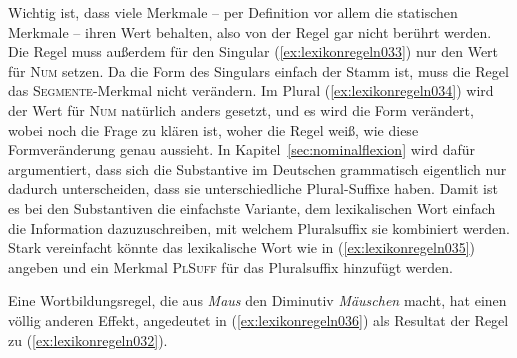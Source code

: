 \begin{exe}
  \ex\label{ex:lexikonregeln031}
  \begin{xlist}
  \end{xlist}
\end{exe}

Wichtig ist, dass viele Merkmale -- per Definition vor allem die statischen Merkmale -- ihren Wert behalten, also von der Regel gar nicht berührt werden.
Die Regel muss außerdem für den Singular (\ref{ex:lexikonregeln033}) nur den Wert für \textsc{Num} setzen.
Da die Form des Singulars einfach der Stamm ist, muss die Regel das \textsc{Segmente}-Merkmal nicht verändern.
Im Plural (\ref{ex:lexikonregeln034}) wird der Wert für \textsc{Num} natürlich anders gesetzt, und es wird die Form verändert, wobei noch die Frage zu klären ist, woher die Regel weiß, wie diese Formveränderung genau aussieht.
In Kapitel~\ref{sec:nominalflexion} wird dafür argumentiert, dass sich die Substantive im Deutschen grammatisch eigentlich nur dadurch unterscheiden, dass sie unterschiedliche Plural-Suffixe haben.
Damit ist es bei den Substantiven die einfachste Variante, dem lexikalischen Wort einfach die Information dazuzuschreiben, mit welchem Pluralsuffix sie kombiniert werden.
Stark vereinfacht könnte das lexikalische Wort wie in (\ref{ex:lexikonregeln035}) angeben und ein Merkmal \textsc{PlSuff} für das Pluralsuffix hinzufügt werden.

\begin{exe}
\end{exe}

Eine Wortbildungsregel, die \zB aus \textit{Maus} den Diminutiv \textit{Mäuschen} macht, hat einen völlig anderen Effekt, angedeutet in (\ref{ex:lexikonregeln036}) als Resultat der Regel zu (\ref{ex:lexikonregeln032}).

